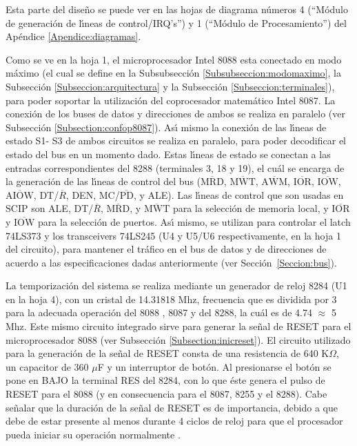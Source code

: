Esta parte del dise\~no se puede ver en las hojas de diagrama n\'umeros 4 (``M\'odulo de %
generaci\'on de l\'{\i}neas de control/IRQ's'') y 1 (``M\'odulo de Procesamiento'')  del %
Ap\'endice \ref{Apendice:diagramas}.

Como se ve en la hoja 1, el microprocesador Intel 8088 esta conectado en modo m\'aximo (el cual %
se define en la Subsubsecci\'on \ref{Subsubseccion:modomaximo}, la Subsecci\'on %
\ref{Subseccion:arquitectura} y la Subsecci\'on \ref{Subseccion:terminales}), para poder %
soportar la utilizaci\'on del coprocesador matem\'atico Intel 8087. La conexi\'on de los buses %
de datos y direcciones de ambos se realiza en paralelo (ver Subsecci\'on %
\ref{Subsection:confop8087}). As\'{\i} mismo la conexi\'on de las l\'{\i}neas de estado S1-%
S3 de ambos circuitos se realiza en paralelo, para poder decodificar el estado del bus en un %
momento dado. Estas l\'{\i}neas de estado se conectan a las entradas correspondientes del 8288 %
(terminales 3, 18 y 19), el cu\'al se encarga de la generaci\'on de las l\'{\i}neas de control %
del bus ($\overline{\mbox{MRD}}$, $\overline{\mbox{MWT}}$, %
$\overline{\mbox{AWM}}$, $\overline{\mbox{IOR}}$, $\overline{\mbox{IOW}}$, %
$\overline{\mbox{AIOW}}$, DT/$\overline{R}$,  DEN, MC/$\overline{\mbox{PD}}$, y %
ALE). Las l\'{\i}neas de control que son usadas en SCIP son ALE, DT/$\overline{R}$,  %
$\overline{\mbox{MRD}}$, y $\overline{\mbox{MWT}}$ para la selecci\'on de memoria %
local, y $\overline{\mbox{IOR}}$ y $\overline{\mbox{IOW}}$ para la selecci\'on de %
puertos. As\'{\i} mismo, se utilizan para controlar el latch 74LS373 y los transceivers 74LS245 %
(U4 y U5/U6 respectivamente, en la hoja 1 del circuito), para mantener el tr\'afico en el bus de %
datos y de direcciones de acuerdo a las especificaciones dadas anteriormente (ver %
Secci\'on~\ref{Seccion:bus}).

La temporizaci\'on del sistema se realiza mediante un generador de reloj 8284 (U1 en la hoja 4), %
con un cristal de 14.31818 Mhz, frecuencia que es dividida por 3 para la adecuada operaci\'on %
del 8088 , 8087 y del 8288, la cu\'al es de 4.74 $\approx$ 5 Mhz. Este mismo circuito %
integrado sirve para generar la se\~nal de RESET para el microprocesador 8088 (ver Subsecci\'on %
\ref{Subsection:inicreset}). El circuito utilizado para la generaci\'on de la se\~nal de RESET %
consta de una resistencia de 640 K$\Omega$, un capacitor de 360 $\mu$F y un interruptor de %
bot\'on. Al presionarse el bot\'on se pone en BAJO la terminal RES del 8284, con lo que \'este %
genera el pulso de RESET para el 8088 (y en consecuencia para el 8087, 8255 y el 8288). Cabe %
se\~nalar que la duraci\'on de la se\~nal de RESET es de importancia, debido a que debe de %
estar presente al menos durante 4 ciclos de reloj para que el procesador pueda iniciar su %
operaci\'on normalmente \cite{Intel:Micro}. 

